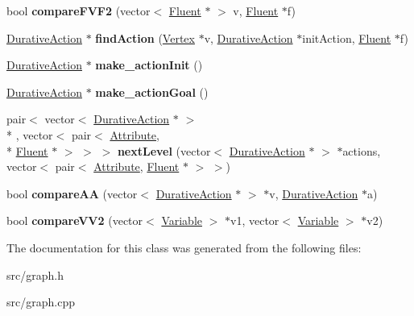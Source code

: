\begin{DoxyCompactItemize}
\item 
\hypertarget{classGraph_aba3580ff75e8af1c3699cd622d924106}{bool {\bfseries compare\+F\+V\+F2} (vector$<$ \hyperlink{classFluent}{Fluent} $\ast$ $>$ v, \hyperlink{classFluent}{Fluent} $\ast$f)}\label{classGraph_aba3580ff75e8af1c3699cd622d924106}

\item 
\hypertarget{classGraph_aa4cc455d5cc9c728ed44715c3f1b4118}{\hyperlink{classDurativeAction}{Durative\+Action} $\ast$ {\bfseries find\+Action} (\hyperlink{classVertex}{Vertex} $\ast$v, \hyperlink{classDurativeAction}{Durative\+Action} $\ast$init\+Action, \hyperlink{classFluent}{Fluent} $\ast$f)}\label{classGraph_aa4cc455d5cc9c728ed44715c3f1b4118}

\item 
\hypertarget{classGraph_ae5bb65f2f91877224d50d6e74155141c}{\hyperlink{classDurativeAction}{Durative\+Action} $\ast$ {\bfseries make\+\_\+action\+Init} ()}\label{classGraph_ae5bb65f2f91877224d50d6e74155141c}

\item 
\hypertarget{classGraph_af5bef8e78eba8a8d69170c448be2c952}{\hyperlink{classDurativeAction}{Durative\+Action} $\ast$ {\bfseries make\+\_\+action\+Goal} ()}\label{classGraph_af5bef8e78eba8a8d69170c448be2c952}

\item 
\hypertarget{classGraph_af71ad52b9cbc5e046d793d304c72852f}{pair$<$ vector$<$ \hyperlink{classDurativeAction}{Durative\+Action} $\ast$ $>$\\*
, vector$<$ pair$<$ \hyperlink{classAttribute}{Attribute}, \\*
\hyperlink{classFluent}{Fluent} $\ast$ $>$ $>$ $>$ {\bfseries next\+Level} (vector$<$ \hyperlink{classDurativeAction}{Durative\+Action} $\ast$ $>$ $\ast$actions, vector$<$ pair$<$ \hyperlink{classAttribute}{Attribute}, \hyperlink{classFluent}{Fluent} $\ast$ $>$ $>$)}\label{classGraph_af71ad52b9cbc5e046d793d304c72852f}

\item 
\hypertarget{classGraph_a4986d2fe8fb31c748c99e1ecb3c26a01}{bool {\bfseries compare\+A\+A} (vector$<$ \hyperlink{classDurativeAction}{Durative\+Action} $\ast$ $>$ $\ast$v, \hyperlink{classDurativeAction}{Durative\+Action} $\ast$a)}\label{classGraph_a4986d2fe8fb31c748c99e1ecb3c26a01}

\item 
\hypertarget{classGraph_aa9bb1a99a07e7c2e2b996b43baa9c63e}{bool {\bfseries compare\+V\+V2} (vector$<$ \hyperlink{classVariable}{Variable} $>$ $\ast$v1, vector$<$ \hyperlink{classVariable}{Variable} $>$ $\ast$v2)}\label{classGraph_aa9bb1a99a07e7c2e2b996b43baa9c63e}

\end{DoxyCompactItemize}


The documentation for this class was generated from the following files\+:\begin{DoxyCompactItemize}
\item 
src/graph.\+h\item 
src/graph.\+cpp\end{DoxyCompactItemize}
